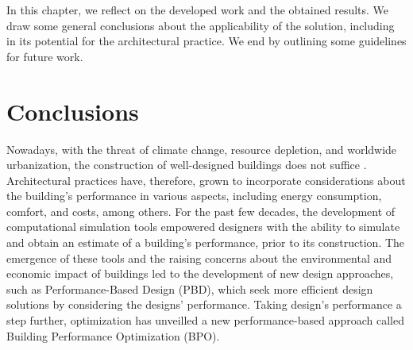 \label{chap:conclusion}

In this chapter, we reflect on the developed work and the obtained results. We draw some general conclusions about the applicability of the solution, including in its potential for the architectural practice. We end by outlining some guidelines for future work. 

\section{Conclusions}


Nowadays, with the threat of climate change, resource depletion, and worldwide urbanization, the construction of well-designed buildings does not suffice \cite{Wortmann2015AdvSBO}. Architectural practices have, therefore, grown to incorporate considerations about the building's performance in various aspects, including energy consumption, comfort, and costs, among others. For the past few decades, the development of computational simulation tools empowered designers with the ability to simulate and obtain an estimate of a building’s performance, prior to its construction. The emergence of these tools and the raising concerns about the environmental and economic impact of buildings led to the development of new design approaches, such as Performance-Based Design (PBD), which seek more efficient design solutions by considering the designs’ performance. Taking design’s performance a step further, optimization has unveilled a new performance-based approach called Building Performance Optimization (BPO). 


